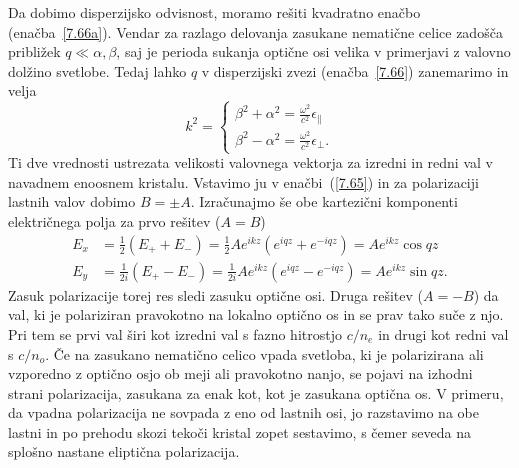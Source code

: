 Da dobimo disperzijsko odvisnost, moramo rešiti kvadratno enačbo (enačba~\ref{7.66a}). 
Vendar za razlago delovanja zasukane nematične celice zadošča približek 
$q\ll\alpha, \beta$, saj je perioda sukanja optične osi
velika v primerjavi z valovno dolžino svetlobe. Tedaj lahko $q$ v disperzijski
zvezi (enačba~\ref{7.66}) zanemarimo in velja
\begin{equation}
k^{2}=
\begin{cases}
\beta^{2}+\alpha^{2}=\frac{\omega^{2}}{c^{2}}\epsilon_{\parallel}\\
\beta^{2}-\alpha^{2}=\frac{\omega^{2}}{c^{2}}\epsilon_{\bot}.
\end{cases}
\label{7.67}
\end{equation}
Ti dve vrednosti ustrezata velikosti valovnega vektorja za izredni
in redni val v navadnem enoosnem kristalu. Vstavimo ju v enačbi~(\ref{7.65})
in za polarizaciji lastnih valov dobimo $B=\pm A$.
Izračunajmo še obe kartezični komponenti električnega polja za prvo rešitev ($A=B$)
\begin{align}
E_{x} &=  \frac{1}{2}(E_{+}+E_{-})  =  \frac{1}{2}Ae^{ikz}(e^{iqz}+e^{-iqz})  =  Ae^{ikz}\cos qz\\
E_{y} & = \frac{1}{2i}(E_{+}-E_{-})  =  \frac{1}{2i}Ae^{ikz}(e^{iqz}-e^{-iqz})  =  Ae^{ikz}\sin qz.
\label{7.68}
\end{align}
Zasuk polarizacije torej res sledi zasuku optične osi. Druga rešitev ($A=-B$) da val,
ki je polariziran pravokotno na lokalno optično os in se prav tako
suče z njo. Pri tem se prvi val širi kot izredni val s fazno hitrostjo $c/n_{e}$ in  
drugi kot redni val s $c/n_{o}$. Če na zasukano
nematično celico vpada svetloba, ki je polarizirana ali vzporedno z 
optično osjo ob meji ali pravokotno nanjo, se pojavi na izhodni strani 
polarizacija, zasukana za enak kot, kot je zasukana optična os. 
V primeru, da vpadna polarizacija ne sovpada z eno od
lastnih osi, jo razstavimo na obe lastni in po prehodu skozi
tekoči kristal zopet sestavimo, s čemer seveda na splošno nastane eliptična
polarizacija.

